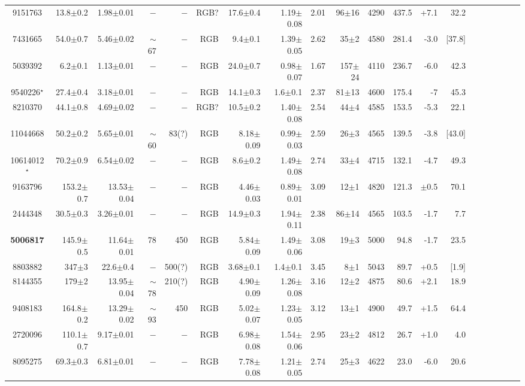 \begin{landscape}
\begin{table}[tp!]
\begin{tabular}{c|rrrrrrrrrrrrrrrrrrr}
\hline
{9151763}	 & 13.8$\pm$0.2 & 1.98$\pm$0.01 	& $-$ & $-$ &  RGB? & 17.6$\pm$0.4 & 1.19$\pm$0.08 & 2.01 & 96$\pm$16 & 4290 & 437.5 & +7.1 & 32.2\\
{7431665}	 &54.0$\pm$0.7 & 5.46$\pm$0.02& $\sim$67 & $-$ &  RGB & 9.4$\pm$0.1 & 1.39$\pm$0.05 & 2.62 & 35$\pm$2 & 4580 & 281.4&-3.0 &[37.8]\\
{5039392} & 6.2$\pm$0.1 & 1.13$\pm$0.01 & $-$ & $-$ & RGB &  24.0$\pm$0.7 & 0.98$\pm$0.07 & 1.67 & 157$\pm$24 & 4110& 236.7 & -6.0 &42.3\\
{9540226}$^\star$ & 27.4$\pm$0.4 & 3.18$\pm$0.01 & $-$ & $-$ & RGB & 14.1$\pm$0.3 & 1.6$\pm$0.1 & 2.37 & 81$\pm$13 & 4600 & 175.4 &  -7 & 45.3\\
{8210370}	 &44.1$\pm$0.8 & 4.69$\pm$0.02	& $-$ & $-$ &  RGB? & 10.5$\pm$0.2 & 1.40$\pm$0.08 & 2.54 & 44$\pm$4  & 4585 & 153.5 & -5.3 & 22.1\\
{11044668}&50.2$\pm$0.2 & 5.65$\pm$0.01	& $\sim$60 & 83(?) &  RGB & 8.18$\pm$0.09 & 0.99$\pm$0.03 & 2.59 & 26$\pm$3 & 4565 & 139.5 & -3.8& [43.0]\\
{10614012$^\star$}&70.2$\pm$0.9	& 6.54$\pm$0.02 	& $-$ & $-$&  RGB & 8.6$\pm$0.2& 1.49$\pm$0.08 & 2.74 & 33$\pm$4 & 4715 & 132.1 & -4.7 &  49.3\\
{9163796}	 &153.2$\pm$0.7& 13.53$\pm$0.04	& $-$ & $-$&  RGB & 4.46$\pm$0.03 & 0.89$\pm$0.01 & 3.09 &  12$\pm$1  & 4820 & 121.3 &$\pm$0.5& 70.1 \\
{2444348} & 30.5$\pm$0.3& 3.26$\pm$0.01  	& $-$ & $-$ &  RGB & 14.9$\pm$0.3 &1.94$\pm$0.11 & 2.38 & 86$\pm$14 & 4565 & 103.5 & -1.7 & 7.7\\
\textbf{5006817}& 145.9$\pm$0.5 & 11.64$\pm$0.01 & 78 & 450 &  RGB & 5.84$\pm$0.09 & 1.49$\pm$0.06 & 3.08 & 19$\pm$3 & 5000 & 94.8 & -1.7& 23.5\\
8803882 & 347$\pm$3& 22.6$\pm$0.4& $-$ & 500(?) & RGB   & 3.68$\pm$0.1  & 1.4$\pm$0.1 & 3.45& 8$\pm$1& 5043 & 89.7 & +0.5 & [1.9]\\
{8144355}	 & 179$\pm$2& 13.95$\pm$0.04	& $\sim$78 & 210(?)&  RGB & 4.90$\pm$0.09 & 1.26$\pm$0.08 &3.16 & 12$\pm$2  & 4875& 80.6 & +2.1 & 18.9\\
{9408183} & 164.8$\pm$0.2& 13.29$\pm$0.02 & $\sim$93 & 450 &  RGB & 5.02$\pm$0.07 & 1.23$\pm$0.05 & 3.12 & 13$\pm$1  & 4900 & 49.7 & +1.5& 64.4\\
{2720096} & 110.1$\pm$0.7& 9.17$\pm$0.01 & $-$ & $-$ & RGB   & 6.98$\pm$0.08 & 1.54$\pm$0.06 & 2.95 & 23$\pm$2 & 4812 & 26.7 & +1.0& 4.0 \\
{8095275} & 69.3$\pm$0.3  & 6.81$\pm$0.01 & $-$ & $-$ & RGB & 7.78$\pm$0.08 & 1.21$\pm$0.05 & 2.74 & 25$\pm$3 & 4622 & 23.0 & -6.0 & 20.6 \\ 
 \hline
\end{tabular}\hfill~


\end{table}
\end{landscape}
